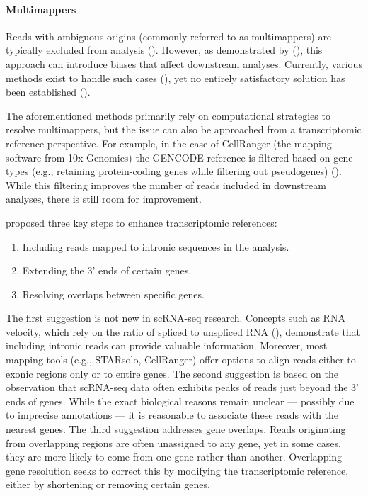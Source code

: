 \paragraph{Multimappers}
Reads with ambiguous origins (commonly referred to as multimappers) are typically excluded from analysis (\cite{Paz2024}).
However, as demonstrated by (\textcite{Paz2024}), this approach can introduce biases that affect downstream analyses.
Currently, various methods exist to handle such cases (\cite{Francoeur2020}),
yet no entirely satisfactory solution has been established (\cite{Paz2024}).

The aforementioned methods primarily rely on computational strategies to resolve multimappers,
but the issue can also be approached from a transcriptomic reference perspective.
For example, in the case of CellRanger (the mapping software from 10x Genomics)
the GENCODE reference is filtered based on gene types (e.g., retaining protein-coding genes while filtering out pseudogenes) (\cite{10xRef}).
While this filtering improves the number of reads included in downstream analyses, there is still room for improvement.

\textcite{Pool2023} proposed three key steps to enhance transcriptomic references:
\begin{enumerate}
  \item Including reads mapped to intronic sequences in the analysis.
  \item Extending the 3' ends of certain genes.
  \item Resolving overlaps between specific genes.
\end{enumerate}
The first suggestion is not new in scRNA-seq research.
Concepts such as RNA velocity, which rely on the ratio of spliced to unspliced RNA (\cite{Manno2018}),
demonstrate that including intronic reads can provide valuable information.
Moreover, most mapping tools (e.g., STARsolo, CellRanger) offer options to align reads either to exonic regions only or to entire genes.
The second suggestion is based on the observation that scRNA-seq data often exhibits peaks of reads just beyond the 3' ends of genes.
While the exact biological reasons remain unclear — possibly due to imprecise annotations —
it is reasonable to associate these reads with the nearest genes.
The third suggestion addresses gene overlaps.
Reads originating from overlapping regions are often unassigned to any gene,
yet in some cases, they are more likely to come from one gene rather than another.
Overlapping gene resolution seeks to correct this by modifying the transcriptomic reference, either by shortening or removing certain genes.


